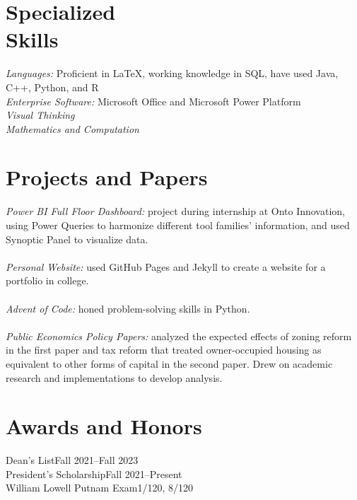 \documentclass[margin, 12pt]{res} %
\begin{document}
\begin{resume}

\section{\sc Specialized \\ Skills} 

{\sl Languages:} Proficient in \LaTeX, working knowledge in SQL, have used Java, C++, Python, and R\\
{\sl Enterprise Software:} Microsoft Office and Microsoft Power Platform\\
{\sl Visual Thinking}\\
{\sl Mathematics and Computation}

\section{\sc Projects and Papers}
{\sl Power BI Full Floor Dashboard:} project during internship at Onto Innovation, using Power Queries to harmonize different tool families' information, and used Synoptic Panel to visualize data.\\
\vspace{4pt}\\
{\sl Personal Website:} used GitHub Pages and Jekyll to create a website for a portfolio in college.\\
\vspace{4pt}\\
{\sl Advent of Code:} honed problem-solving skills in Python.\\
\vspace{4pt}\\
{\sl Public Economics Policy Papers:} analyzed the expected effects of zoning reform in the first paper and tax reform that treated owner-occupied housing as equivalent to other forms of capital in the second paper. Drew on academic research and implementations to develop analysis.
\section{\sc Awards and Honors}
Dean's List\hfill Fall 2021--Fall 2023\\
President's Scholarship\hfill Fall 2021--Present\\
William Lowell Putnam Exam\hfill 1/120, 8/120

\end{resume}
\end{document}
